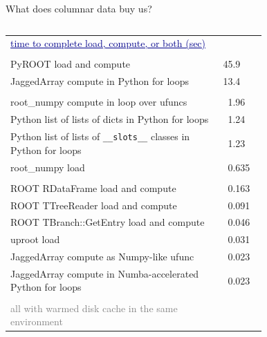 \documentclass[aspectratio=169]{beamer}
\begin{document}
\begin{frame}{What does columnar data buy us?}
\begin{columns}
\begin{columns}
\begin{tabular}{p{0.83\linewidth} l}
\hfill \textcolor{darkblue}{\small\underline{time to complete load, compute, or both (sec)}} & \\
& \\
\hfill \textcolor{rootcolor}{PyROOT load and compute} & 45.9 \\
\hfill \textcolor{mycolor}{JaggedArray compute in Python for loops} & 13.4 \\
& \\
\hfill \textcolor{rootnpcolor}{root\_numpy compute in loop over ufuncs} & \ 1.96 \\
\hfill \textcolor{pythoncolor}{Python list of lists of dicts in Python for loops} & \ 1.24 \\
\hfill \textcolor{pythoncolor}{Python list of lists of {\tt\scriptsize \_\_slots\_\_} classes in Python for loops} & \ 1.23 \\
\hfill \textcolor{rootnpcolor}{root\_numpy load} & \ 0.635 \\
& \\
\hfill \textcolor{rootcolor}{ROOT RDataFrame load and compute} & \ 0.163 \\          %
\hfill \textcolor{rootcolor}{ROOT TTreeReader load and compute} &  \ 0.091 \\        %
\hfill \textcolor{rootcolor}{ROOT TBranch::GetEntry load and compute} & \ 0.046 \\   %
\hfill \textcolor{mycolor}{uproot load} & \ 0.031 \\
\hfill \textcolor{mycolor}{JaggedArray compute as Numpy-like ufunc} & \ 0.023 \\
\hfill \textcolor{mycolor}{JaggedArray compute in Numba-accelerated Python for loops} & \ 0.023 \\
& \\
\hfill \textcolor{gray}{\scriptsize all with warmed disk cache in the same environment} & \\
\end{tabular}
\end{columns}
\end{columns}
\end{frame}
\end{document}
